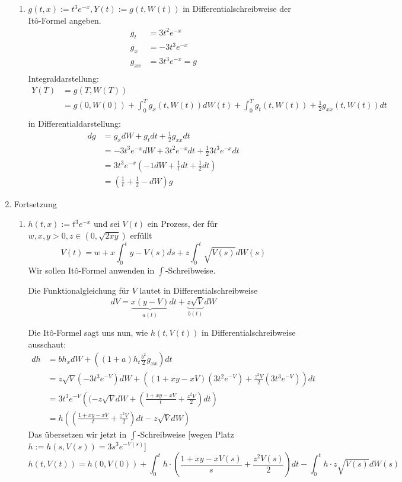 \documentclass[a4paper,11pt,notitlepage,fullpage]{article}
\begin{document}
\begin{enumerate}
\begin{enumerate}
\item $g(t,x):= t^3e^{-x}, Y(t):=g(t, W(t))$ in Differentialschreibweise der Itô-Formel angeben.
\begin{align*}
g_t &= 3t^2e^{-x}\\
g_x &= -3t^3e^{-x}\\
g_{xx} &= 3t^3e^{-x} = g\\
\end{align*}
Integraldarstellung:
\begin{align*}
Y(T) &= g(T, W(T))\\
&= g(0, W(0)) + \int_0^T g_x(t, W(t)) dW(t) + \int_0^T g_t(t, W(t)) + \frac{1}{2} g_{xx}(t, W(t)) dt\\
\end{align*}
in Differentialdarstellung:
\begin{align*}
dg &= g_x dW + g_t dt + \frac{1}{2} g_{xx} dt\\
&= -3t^3e^{-x} dW + 3t^2e^{-x} dt + \frac{1}{2} 3t^3e^{-x} dt\\
&= 3t^3e^{-x} \left(-1dW + \frac{1}{t} dt +\frac{1}{2} dt \right)\\
&= \left(\frac{1}{t} + \frac{1}{2} -dW \right)g
\end{align*}

\end{enumerate}

\item Fortsetzung
\begin{enumerate}
\item $h(t,x):= t^3e^{-x}$ und sei $V(t)$ ein Prozess, der für $w,x,y>0, z\in (0, \sqrt{2xy})$ erfüllt
$$V(t) = w + x\int_0^t y-V(s) ds + z\int_0^t \sqrt{V(s)} dW(s)$$
Wir sollen Itô-Formel anwenden in $\int$-Schreibweise.

Die Funktionalgleichung für $V$ lautet in Differentialschreibweise
$$dV = \underbrace{x(y-V)}_{a(t)}dt + \underbrace{z\sqrt{V}}_{b(t)}dW$$

Die Itô-Formel sagt uns nun, wie $h(t, V(t))$ in Differentialschreibweise ausschaut:
\begin{align*}
dh &= b h_x dW + \left( (1+a)h_t \frac{b^2}{2} g_{xx}  \right) dt\\
&= z\sqrt{V} (-3t^3e^{-V}) dW + \left( (1+xy-xV) (3t^2e^{-V}) + \frac{z^2V}{2} (3t^3e^{-V})  \right) dt\\
&= 3t^3e^{-V} \left((-z\sqrt{V}dW + \left(\frac{1+xy-xV}{t} + \frac{z^2V}{2} \right) dt \right)\\
&= h \left(\left(\frac{1+xy-xV}{t} + \frac{z^2V}{2} \right) dt  -z\sqrt{V}dW \right)
\end{align*}
Das übersetzen wir jetzt in $\int$-Schreibweise [wegen Platz $h:=h(s,V(s))=3s^3e^{-V(s)}$]
$$h(t,V(t)) = h(0, V(0)) + \int_0^t h\cdot\left(\frac{1+xy-xV(s)}{s} + \frac{z^2V(s)}{2}\right) dt  - \int_0^t h\cdot z\sqrt{V(s)}dW(s)$$


\end{enumerate}
\end{enumerate}
\end{document}
